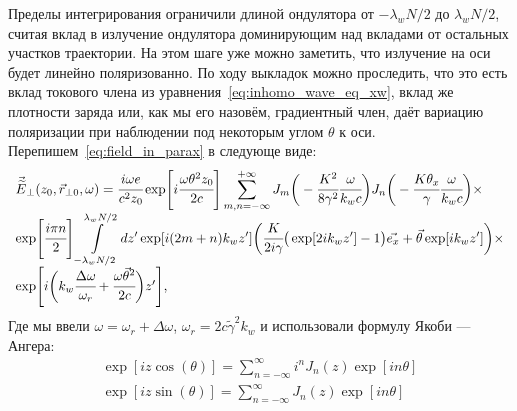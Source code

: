 Пределы интегрирования ограничили длиной ондулятора от $-\lambda_w N/2$ до $\lambda_w N/2$, считая вклад в излучение ондулятора доминирующим над вкладами от остальных участков траектории. На этом шаге уже можно заметить, что излучение на оси будет линейно поляризованно. По ходу выкладок можно проследить, что это есть вклад токового члена из уравнения~\ref{eq:inhomo_wave_eq_xw}, вклад же плотности заряда или, как мы его назовём, градиентный член, даёт вариацию поляризации при наблюдении под некоторым углом $\theta$ к оси.
Перепишем~\ref{eq:field_in_parax} в следующе виде:
\begin{equation}
		\label{eq:field_in_parax_Bessel}
		\begin{array}{lcl}
			\vec{\widetilde{E}}_{\bot}(z_0,  \vec{r}_{\bot 0}, \omega) =
			\cfrac{i\omega e}{c^2z_0} \exp[i\cfrac{\omega \theta^2 z_0}{2c}]
			\displaystyle\sum_{m,n=-\infty}^{+\infty}
			J_m\bigg(-\cfrac{K^2}{8\gamma^2}\cfrac{\omega}{k_w c}\bigg)
			J_n\bigg(-\cfrac{K{\theta_x}}{\gamma}\cfrac{\omega}{k_w c}\bigg)\times\\
			\exp[\cfrac{i\pi n}{2}]
			\displaystyle\int\limits_{-\lambda_w N/2}^{\lambda_w N/2} dz'\exp[i(2m + n)k_wz']
			\bigg(\cfrac{K}{2i\gamma}\big(\exp[2ik_w z'] - 1\big)\vec{e_x} + \vec{\theta}\exp[ik_w z']\bigg)\times\\
			\exp[i\bigg(k_w \cfrac{\Delta\omega}{\omega_r} + 
			\cfrac{\omega\vec{\theta}^2}{2c}\bigg)z'],
		\end{array}	
\end{equation}
Где мы ввели $\omega = \omega_r + \Delta\omega$, $\omega_r = 2c\widetilde{\gamma}^2k_w$ и использовали формулу Якоби — Ангера:
\begin{equation}
	\begin{array}{lcl}
		\exp[iz\cos(\theta)] = 
		\displaystyle\sum\limits_{n =-\infty}^{\infty}
		i^n J_n(z)\exp[in\theta]\\	
		\exp[iz\sin(\theta)] = 
		\displaystyle\sum\limits_{n =-\infty}^{\infty}
		J_n(z)\exp[in\theta]
	\end{array}	
\end{equation}

